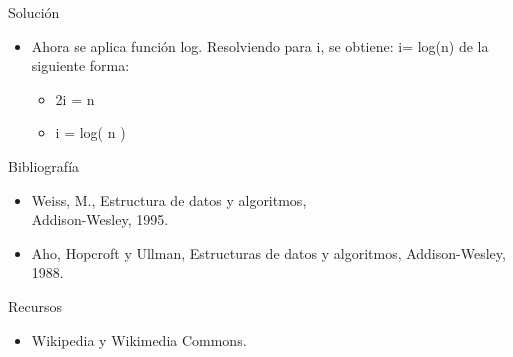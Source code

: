 \documentclass{beamer} %
\begin{document}
     \begin{frame}
      \begin{block}{Solución}
       \begin{itemize}
         \item  Ahora se aplica función log. Resolviendo para i, se obtiene: i=  log(n) de la siguiente forma:
          \begin{itemize}
         \item 2i = n
         \item i = log( n )
         \end{itemize}
       \end{itemize}
      \end{block}
     \end{frame}

\begin{frame}
 \begin{block}{Bibliografía}
  \begin{itemize}
    \item Weiss, M., Estructura de datos y algoritmos,\\ Addison-Wesley, 1995.
    \item Aho, Hopcroft y Ullman, Estructuras de datos y algoritmos, Addison-Wesley, 1988.
  \end{itemize}
 \end{block}
 \begin{block}{Recursos}
  \begin{itemize}
    \item Wikipedia y Wikimedia Commons.
  \end{itemize}
 \end{block}
\end{frame}
\end{document}
